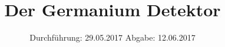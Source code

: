 

\subject{V 18}
\title{Der Germanium Detektor}
\date{
  Durchführung: 29.05.2017
  \hspace{3em}
  Abgabe: 12.06.2017
}



\maketitle
\thispagestyle{empty}
\tableofcontents
\newpage






\printbibliography


